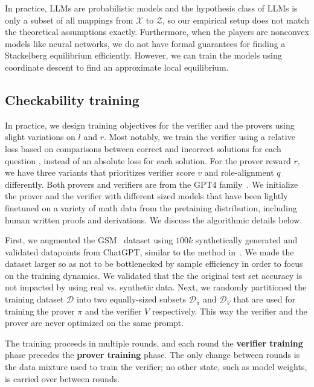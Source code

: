 \documentclass{article}
\begin{document}
In practice, LLMs are probabilistic models and the hypothesis class of LLMs is only a subset of all mappings from $\mathcal{X}$ to $\mathcal{Z}$, so our empirical setup does not match the theoretical assumptions exactly. Furthermore, when the players are nonconvex models like neural networks, we do not have formal guarantees for finding a Stackelberg equilibrium efficiently. However, we can train the models using coordinate descent to find an approximate local equilibrium.


\subsection{Checkability training}\label{sec:legibility-training}
In practice, we design training objectives for the verifier and the provers using slight variations on $l$ and $r$. Most notably, we train the verifier using a relative loss based on comparisons between correct and incorrect solutions for each question \citep{bradley1952rank}, instead of an absolute loss for each solution. For the prover reward $r$, we have three variants that prioritizes verifier score $v$ and role-alignment $q$ differently. Both provers and verifiers are from the GPT4 family~\citep{achiam2023gpt}. We initialize the prover and the verifier with different sized models that have been lightly finetuned on a variety of math data from the pretaining distribution, including human written proofs and derivations. We discuss the algorithmic details below.


First, we augmented the GSM~\citep{cobbe2021training} dataset using $100k$ synthetically generated and validated datapoints from ChatGPT, similar to the method in~\citet{liu2023tinygsm}. We made the dataset larger so as not to be bottlenecked by sample efficiency in order to focus on the training dynamics. We validated that the the original test set accuracy is not impacted by using real vs. synthetic data. Next, we randomly partitioned the training dataset $\mathcal{D}$ into two equally-sized subsets $\mathcal{D}_{\pi}$ and $\mathcal{D}_{V}$ that are used for training the prover $\pi$ and the verifier $V$ respectively. This way the verifier and the prover are never optimized on the same prompt.

The training proceeds in multiple rounds, and each round the \textbf{verifier training} phase precedes the \textbf{prover training} phase. The only change between rounds is the data mixture used to train the verifier; no other state, such as model weights, is carried over between rounds.
\end{document}
